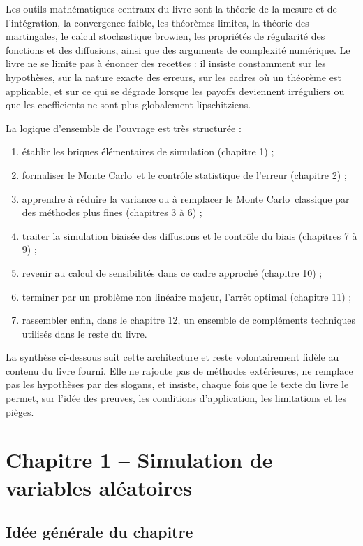 \documentclass[11pt,a4paper]{article}
\newcommand{\mc}{Monte Carlo}
\begin{document}
Les outils mathématiques centraux du livre sont la théorie de la mesure et de l'intégration, la convergence faible, les théorèmes limites, la théorie des martingales, le calcul stochastique browien, les propriétés de régularité des fonctions et des diffusions, ainsi que des arguments de complexité numérique. Le livre ne se limite pas à énoncer des recettes : il insiste constamment sur les hypothèses, sur la nature exacte des erreurs, sur les cadres où un théorème est applicable, et sur ce qui se dégrade lorsque les payoffs deviennent irréguliers ou que les coefficients ne sont plus globalement lipschitziens.

La logique d'ensemble de l'ouvrage est très structurée :
\begin{enumerate}
  \item établir les briques élémentaires de simulation (chapitre 1) ;
  \item formaliser le \mc\ et le contrôle statistique de l'erreur (chapitre 2) ;
  \item apprendre à réduire la variance ou à remplacer le \mc\ classique par des méthodes plus fines (chapitres 3 à 6) ;
  \item traiter la simulation biaisée des diffusions et le contrôle du biais (chapitres 7 à 9) ;
  \item revenir au calcul de sensibilités dans ce cadre approché (chapitre 10) ;
  \item terminer par un problème non linéaire majeur, l'arrêt optimal (chapitre 11) ;
  \item rassembler enfin, dans le chapitre 12, un ensemble de compléments techniques utilisés dans le reste du livre.
\end{enumerate}

La synthèse ci-dessous suit cette architecture et reste volontairement fidèle au contenu du livre fourni. Elle ne rajoute pas de méthodes extérieures, ne remplace pas les hypothèses par des slogans, et insiste, chaque fois que le texte du livre le permet, sur l'idée des preuves, les conditions d'application, les limitations et les pièges.

\section{Chapitre 1 -- Simulation de variables aléatoires}

\subsection{Idée générale du chapitre}
\end{document}
